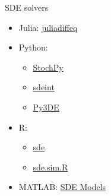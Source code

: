 \begin{frame}{SDE solvers}
    \begin{itemize}
        \item
            Julia:
            \href{http://docs.juliadiffeq.org/latest/}{juliadiffeq}
         \item
             Python:
             \begin{itemize}
                \item    
                    \href{%
                        https://pythonhosted.org/StochPy/userguide_doc.html
                    }{StochPy}
                \item
                \href{%
                    https://pypi.org/project/sdeint/
                }{sdeint}
                \item
                    \href{https://pythonhosted.org/PyS3DE/}{Py3DE}
             \end{itemize}             
         \item
             R:
             \begin{itemize}
                \item
                    \href{%
                https://www.rdocumentation.org/packages/sde/versions/2.0.15}{%
                sde}
                \item
                    \href{https://rdrr.io/cran/sde/src/R/sde.sim.R}{sde.sim.R}
                
             \end{itemize}
            \item
                MATLAB:
                \href{%
                    https://www.mathworks.com/help/finance/sde-objects.html}{%
                    SDE Models}
    \end{itemize}
 \end{frame}